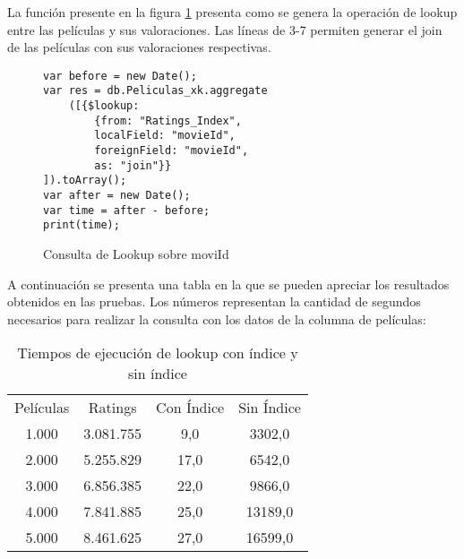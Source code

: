 \documentclass[conference,compsoc]{sty/IEEEtran}
\begin{document}
La  función presente en la figura \ref{fig:consulta-lookupIndices} presenta como se  genera la operación de lookup entre  las películas y sus valoraciones. Las líneas de 3-7 permiten generar el join de las películas con sus valoraciones respectivas.

\begin{figure}
    \begin{verbatim}
var before = new Date();
var res = db.Peliculas_xk.aggregate
    ([{$lookup:
        {from: "Ratings_Index",
        localField: "movieId",
        foreignField: "movieId",
        as: "join"}}
]).toArray();
var after = new Date();
var time = after - before;
print(time);
\end{verbatim}
\caption{Consulta de Lookup sobre moviId} 
\label{fig:consulta-lookupIndices}
\end{figure}

A continuación se presenta una tabla en la que se pueden apreciar los resultados obtenidos en las pruebas. Los números representan la cantidad de segundos necesarios para realizar la consulta con los datos de la columna de películas:

\begin{table}
\begin{center}
\begin{tabular}{ c c c c }
 Películas & Ratings & Con Índice & Sin Índice \\ 
 1.000 & 3.081.755 & 9,0 & 3302,0 \\  
 2.000 & 5.255.829 & 17,0 & 6542,0 \\
 3.000 & 6.856.385 & 22,0 & 9866,0 \\  
 4.000 & 7.841.885 & 25,0 & 13189,0 \\
 5.000 & 8.461.625 & 27,0 & 16599,0
\end{tabular}
\end{center}
\caption{Tiempos de ejecución de lookup con índice y sin índice}
\label{table:1}
\end{table}
\end{document}
